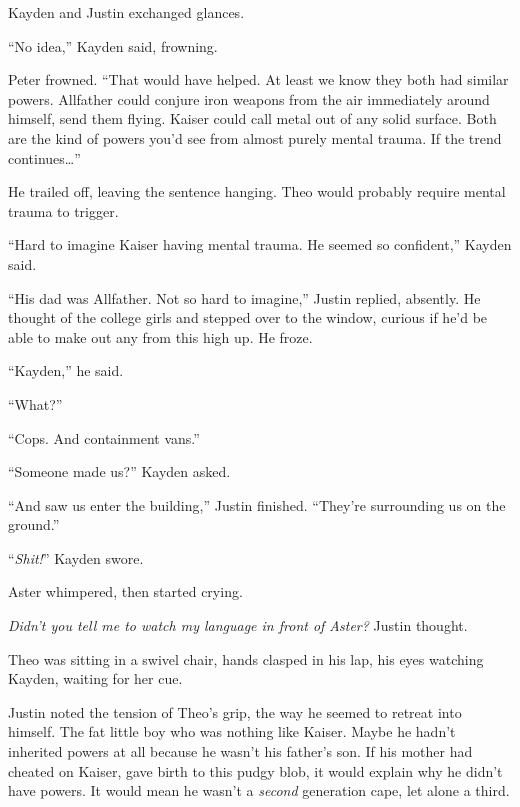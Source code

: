 Kayden and Justin exchanged glances.



``No idea,'' Kayden said, frowning.



Peter frowned.  ``That would have helped.  At least we know they both had similar powers.  Allfather could conjure iron weapons from the air immediately around himself, send them flying.  Kaiser could call metal out of any solid surface.  Both are the kind of powers you'd see from almost purely mental trauma.  If the trend continues\ldots''



He trailed off, leaving the sentence hanging.  Theo would probably require mental trauma to trigger.



``Hard to imagine Kaiser having mental trauma.  He seemed so confident,'' Kayden said.



``His dad was Allfather.  Not so hard to imagine,'' Justin replied, absently.  He thought of the college girls and stepped over to the window, curious if he'd be able to make out any from this high up.  He froze.



``Kayden,'' he said.



``What?''



``Cops.  And containment vans.''



``Someone made us?''  Kayden asked.



``And saw us enter the building,'' Justin finished.  ``They're surrounding us on the ground.''



``\emph{Shit!}''  Kayden swore.



Aster whimpered, then started crying.



\emph{Didn't you tell me to watch my language in front of Aster?}  Justin thought.



Theo was sitting in a swivel chair, hands clasped in his lap, his eyes watching Kayden, waiting for her cue.



Justin noted the tension of Theo's grip, the way he seemed to retreat into himself.  The fat little boy who was nothing like Kaiser.  Maybe he hadn't inherited powers at all because he wasn't his father's son.  If his mother had cheated on Kaiser, gave birth to this pudgy blob, it would explain why he didn't have powers.  It would mean he wasn't a \emph{second} generation cape, let alone a third.



